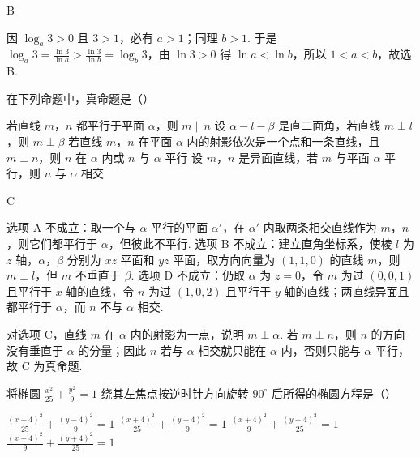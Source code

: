 \documentclass[UTF8,a4paper,oneside,11pt]{ctexbook}
\begin{document}
\begin{answer}
B
\end{answer}

\begin{solution}
因 \(\log_a3>0\) 且 \(3>1\)，必有 \(a>1\)；同理 \(b>1\). 于是
\(\log_a3=\frac{\ln3}{\ln a}>\frac{\ln3}{\ln b}=\log_b3\)，由 \(\ln3>0\) 得 \(\ln a<\ln b\)，所以 \(1<a<b\)，故选 B.
\end{solution}

\begin{problem}
在下列命题中，真命题是（\quad）

\choices
    {若直线 \(m\)，\(n\) 都平行于平面 \(\alpha\)，则 \(m\parallel n\)}
    {设 \(\alpha-l-\beta\) 是直二面角，若直线 \(m\perp l\)，则 \(m\perp\beta\)}
    {若直线 \(m\)，\(n\) 在平面 \(\alpha\) 内的射影依次是一个点和一条直线，且 \(m\perp n\)，则 \(n\) 在 \(\alpha\) 内或 \(n\) 与 \(\alpha\) 平行}
    {设 \(m\)，\(n\) 是异面直线，若 \(m\) 与平面 \(\alpha\) 平行，则 \(n\) 与 \(\alpha\) 相交}
\end{problem}

\begin{answer}
C
\end{answer}

\begin{solution}
选项 A 不成立：取一个与 \(\alpha\) 平行的平面 \(\alpha'\)，在 \(\alpha'\) 内取两条相交直线作为 \(m\)，\(n\)，则它们都平行于 \(\alpha\)，但彼此不平行. 选项 B 不成立：建立直角坐标系，使棱 \(l\) 为 \(z\) 轴，\(\alpha\)，\(\beta\) 分别为 \(xz\) 平面和 \(yz\) 平面，取方向向量为 \((1,1,0)\) 的直线 \(m\)，则 \(m\perp l\)，但 \(m\) 不垂直于 \(\beta\). 选项 D 不成立：仍取 \(\alpha\) 为 \(z=0\)，令 \(m\) 为过 \((0,0,1)\) 且平行于 \(x\) 轴的直线，令 \(n\) 为过 \((1,0,2)\) 且平行于 \(y\) 轴的直线；两直线异面且都平行于 \(\alpha\)，而 \(n\) 不与 \(\alpha\) 相交.

对选项 C，直线 \(m\) 在 \(\alpha\) 内的射影为一点，说明 \(m\perp\alpha\). 若 \(m\perp n\)，则 \(n\) 的方向没有垂直于 \(\alpha\) 的分量；因此 \(n\) 若与 \(\alpha\) 相交就只能在 \(\alpha\) 内，否则只能与 \(\alpha\) 平行，故 C 为真命题.
\end{solution}

\begin{problem}
将椭圆 \(\frac{x^2}{25}+\frac{y^2}{9}=1\) 绕其左焦点按逆时针方向旋转 \(90^\circ\) 后所得的椭圆方程是（\quad）

\choices
    {\(\frac{(x+4)^2}{25}+\frac{(y-4)^2}{9}=1\)}
    {\(\frac{(x+4)^2}{25}+\frac{(y+4)^2}{9}=1\)}
    {\(\frac{(x+4)^2}{9}+\frac{(y-4)^2}{25}=1\)}
    {\(\frac{(x+4)^2}{9}+\frac{(y+4)^2}{25}=1\)}
\end{problem}
\end{document}
